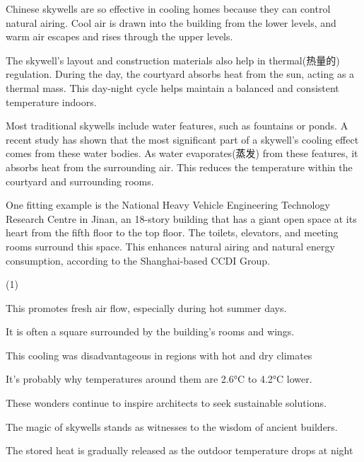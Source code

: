 \documentclass{英语试卷}
\begin{document}
\par Chinese skywells are so effective in cooling homes because they can control natural airing. Cool air is drawn into the building from the lower levels, and warm air escapes and rises through the upper levels. \par
\par The skywell's layout and construction materials also help in thermal(热量的) regulation. During the day, the courtyard absorbs heat from the sun, acting as a thermal mass.  This day-night cycle helps maintain a balanced and consistent temperature indoors.\par
\par Most traditional skywells include water features, such as fountains or ponds. A recent study has shown that the most significant part of a skywell's cooling effect comes from these water bodies.  As water evaporates(蒸发) from these features, it absorbs heat from the surrounding air. This reduces the temperature within the courtyard and surrounding rooms.\par
\par {} One fitting example is the National Heavy Vehicle Engineering Technology Research Centre in Jinan, an 18-story building that has a giant open space at its heart from the fifth floor to the top floor. The toilets, elevators, and meeting rooms surround this space. This enhances natural airing and natural energy consumption, according to the Shanghai-based CCDI Group.\par
\begin{choices}(1)
  \item This promotes fresh air flow, especially during hot summer days.
  \item It is often a square surrounded by the building's rooms and wings.
  \item This cooling was disadvantageous in regions with hot and dry climates
  \item It's probably why temperatures around them are 2.6°C to 4.2°C lower.
  \item These wonders continue to inspire architects to seek sustainable solutions.
  \item The magic of skywells stands as witnesses to the wisdom of ancient builders.
  \item The stored heat is gradually released as the outdoor temperature drops at night
\end{choices}
\end{document}
